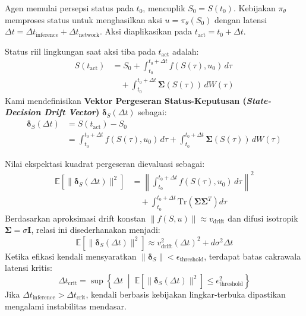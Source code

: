 \documentclass[journal,compsoc]{IEEEtran}
\begin{document}
Agen memulai persepsi status pada $t_0$, mencuplik $S_0 = S(t_0)$. Kebijakan $\pi_\theta$ memproses status untuk menghasilkan aksi $u = \pi_\theta(S_0)$ dengan latensi $\Delta t = \Delta t_{\text{inference}} + \Delta t_{\text{network}}$. Aksi diaplikasikan pada $t_{\text{act}} = t_0 + \Delta t$.

Status riil lingkungan saat aksi tiba pada $t_{\text{act}}$ adalah:
\begin{equation}
\begin{aligned}
S(t_{\text{act}}) &= S_0 + \int_{t_0}^{t_0 + \Delta t} f(S(\tau), u_0) \, d\tau \\
&\quad + \int_{t_0}^{t_0 + \Delta t} \mathbf{\Sigma}(S(\tau)) \, dW(\tau)
\end{aligned}
\end{equation}
Kami mendefinisikan \textbf{Vektor Pergeseran Status-Keputusan (\textit{State-Decision Drift Vector})} $\mathbf{\delta}_S(\Delta t)$ sebagai:
\begin{equation}
\begin{aligned}
\mathbf{\delta}_S(\Delta t) &= S(t_{\text{act}}) - S_0 \\
&= \int_{t_0}^{t_0 + \Delta t} f(S(\tau), u_0) \, d\tau + \int_{t_0}^{t_0 + \Delta t} \mathbf{\Sigma}(S(\tau)) \, dW(\tau)
\end{aligned}
\end{equation}

Nilai ekspektasi kuadrat pergeseran dievaluasi sebagai:
\begin{equation}
\begin{aligned}
\mathbb{E}\left[\|\mathbf{\delta}_S(\Delta t)\|^2\right] &= \left\|\int_{t_0}^{t_0 + \Delta t} f(S(\tau), u_0) \, d\tau\right\|^2 \\
&\quad + \int_{t_0}^{t_0 + \Delta t} \text{Tr}\left(\mathbf{\Sigma} \mathbf{\Sigma}^T\right) d\tau
\end{aligned}
\end{equation}
Berdasarkan aproksimasi drift konstan $\|f(S, u)\| \approx v_{\text{drift}}$ dan difusi isotropik $\mathbf{\Sigma} = \sigma \mathbf{I}$, relasi ini disederhanakan menjadi:
\begin{equation}
\mathbb{E}\left[\|\mathbf{\delta}_S(\Delta t)\|^2\right] \approx v_{\text{drift}}^2 (\Delta t)^2 + d \sigma^2 \Delta t
\end{equation}
Ketika efikasi kendali mensyaratkan $\|\mathbf{\delta}_S\| < \epsilon_{\text{threshold}}$, terdapat batas cakrawala latensi kritis:
\begin{equation}
\Delta t_{\text{crit}} = \sup \left\{ \Delta t \;\middle|\; \mathbb{E}\left[\|\mathbf{\delta}_S(\Delta t)\|^2\right] \le \epsilon_{\text{threshold}}^2 \right\}
\end{equation}
Jika $\Delta t_{\text{inference}} > \Delta t_{\text{crit}}$, kendali berbasis kebijakan lingkar-terbuka dipastikan mengalami instabilitas mendasar.
\end{document}
